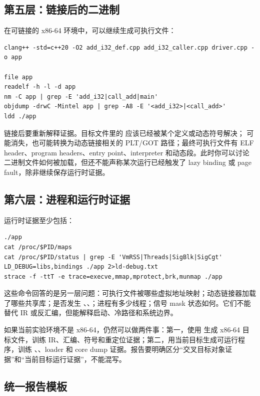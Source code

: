 \subsection{第五层：链接后的二进制}

在可链接的 x86-64 环境中，可以继续生成可执行文件：

\begin{lstlisting}[numbers=none,caption={链接后继续观察}]
clang++ -std=c++20 -O2 add_i32_def.cpp add_i32_caller.cpp driver.cpp -o app

file app
readelf -h -l -d app
nm -C app | grep -E 'add_i32|call_add|main'
objdump -drwC -Mintel app | grep -A8 -E '<add_i32>|<call_add>'
ldd ./app
\end{lstlisting}

链接后要重新解释证据。目标文件里的  应该已经被某个定义或动态符号解决； 可能消失，也可能转换为动态链接相关的 PLT/GOT 路径；最终可执行文件有 ELF header、program headers、entry point、interpreter 和动态段。此时你可以讨论二进制文件如何被加载，但还不能声称某次运行已经触发了 lazy binding 或 page fault，除非继续保存运行时证据。

\subsection{第六层：进程和运行时证据}

运行时证据至少包括：

\begin{lstlisting}[numbers=none,caption={运行时证据命令}]
./app
cat /proc/$PID/maps
cat /proc/$PID/status | grep -E 'VmRSS|Threads|SigBlk|SigCgt'
LD_DEBUG=libs,bindings ./app 2>ld-debug.txt
strace -f -ttT -e trace=execve,mmap,mprotect,brk,munmap ./app
\end{lstlisting}

这些命令回答的是另一层问题：可执行文件被哪些虚拟地址映射；动态链接器加载了哪些共享库；是否发生 、、；进程有多少线程；信号 mask 状态如何。它们不能替代 IR 或反汇编，但能解释启动、冷路径和系统边界。

如果当前实验环境不是 x86-64，仍然可以做两件事：第一，使用  生成 x86-64 目标文件，训练 IR、汇编、符号和重定位证据；第二，用当前目标生成可运行程序，训练 、、loader 和 core dump 证据。报告要明确区分“交叉目标对象证据”和“当前目标运行证据”，不能混写。

\subsection{统一报告模板}

